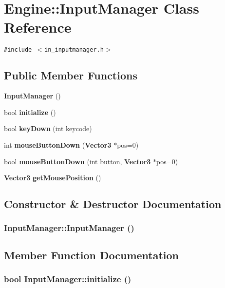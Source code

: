 \section{Engine::InputManager Class Reference}
\label{classEngine_1_1InputManager}
{\tt \#include $<$in\_\-inputmanager.h$>$}

\subsection*{Public Member Functions}
\begin{CompactItemize}
\item 
{\bf InputManager} ()
\item 
bool {\bf initialize} ()
\item 
bool {\bf keyDown} (int keycode)
\item 
int {\bf mouseButtonDown} ({\bf Vector3} $\ast$pos=0)
\item 
bool {\bf mouseButtonDown} (int button, {\bf Vector3} $\ast$pos=0)
\item 
{\bf Vector3} {\bf getMousePosition} ()
\end{CompactItemize}


\subsection{Constructor \& Destructor Documentation}
\subsubsection{\setlength{\rightskip}{0pt plus 5cm}InputManager::InputManager ()}\label{classEngine_1_1InputManager_8be46886da639b26d67181c29dab6d6c}




\subsection{Member Function Documentation}
\subsubsection{\setlength{\rightskip}{0pt plus 5cm}bool InputManager::initialize ()}\label{classEngine_1_1InputManager_7e0883f1a4f15bc8ee50c7c3604abf2a}


